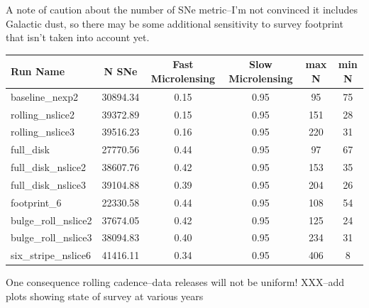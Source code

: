 \documentclass[modern]{aastex62}
\begin{document}
A note of caution about the number of SNe metric--I'm not convinced it includes Galactic dust, so there may be some additional sensitivity to survey footprint that isn't taken into account yet.


\begin{table}
\begin{tabular}{lccccc}

 Run Name &  N SNe &  Fast Microlensing &  Slow Microlensing &  max N &  min N \\
\toprule

baseline\_nexp2 &             30894.34 &                    0.15 &                    0.95 &     95 &     75 \\
rolling\_nslice2 &             39372.89 &                    0.15 &                    0.95 &    151 &     28 \\
rolling\_nslice3 &             39516.23 &                    0.16 &                    0.95 &    220 &     31 \\


\hline
full\_disk &             27770.56 &                    0.44 &                    0.95 &     97 &     67 \\
full\_disk\_nslice2 &             38607.76 &                    0.42 &                    0.95 &    153 &     35 \\
full\_disk\_nslice3 &             39104.88 &                    0.39 &                    0.95 &    204 &     26 \\
                                
                                   
\hline
footprint\_6 &             22330.58 &                    0.44 &                    0.95 &    108 &     54 \\
bulge\_roll\_nslice2 &             37674.05 &                    0.42 &                    0.95 &    125 &     24 \\
bulge\_roll\_nslice3 &             38094.83 &                    0.40 &                    0.95 &    234 &     31 \\
six\_stripe\_nslice6 &             41416.11 &                    0.34 &                    0.95 &    406 &      8 \\
\hline
\end{tabular}
\end{table}



One consequence rolling cadence--data releases will not be uniform! XXX--add plots showing state of survey at various years
\end{document}

